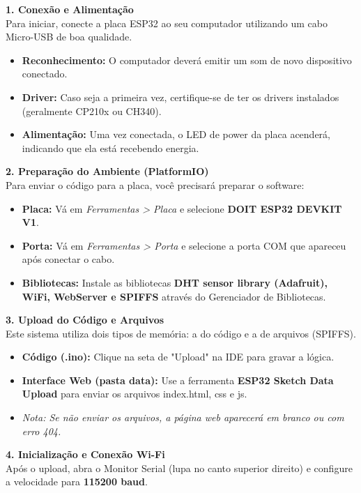 \noindent \textbf{\large 1. Conexão e Alimentação} \\
Para iniciar, conecte a placa ESP32 ao seu computador utilizando um cabo Micro-USB de boa qualidade.

\begin{itemize}
    \item \textbf{Reconhecimento:} O computador deverá emitir um som de novo dispositivo conectado.
    \item \textbf{Driver:} Caso seja a primeira vez, certifique-se de ter os drivers instalados (geralmente CP210x ou CH340).
    \item \textbf{Alimentação:} Uma vez conectada, o LED de power da placa acenderá, indicando que ela está recebendo energia.
\end{itemize}

\noindent \textbf{\large 2. Preparação do Ambiente (PlatformIO)} \\
Para enviar o código para a placa, você precisará preparar o software:

\begin{itemize}
    \item \textbf{Placa:} Vá em \textit{Ferramentas > Placa} e selecione \textbf{DOIT ESP32 DEVKIT V1}.
    \item \textbf{Porta:} Vá em \textit{Ferramentas > Porta} e selecione a porta COM que apareceu após conectar o cabo.
    \item \textbf{Bibliotecas:} Instale as bibliotecas \textbf{DHT sensor library (Adafruit), WiFi, WebServer e SPIFFS} através do Gerenciador de Bibliotecas.
\end{itemize}

\noindent \textbf{\large 3. Upload do Código e Arquivos} \\
Este sistema utiliza dois tipos de memória: a do código e a de arquivos (SPIFFS).

\begin{itemize}
    \item \textbf{Código (.ino):} Clique na seta de "Upload"  na IDE para gravar a lógica.
    \item \textbf{Interface Web (pasta data):} Use a ferramenta \textbf{ESP32 Sketch Data Upload} para enviar os arquivos index.html, css e js.
    \item \textit{Nota: Se não enviar os arquivos, a página web aparecerá em branco ou com erro 404.}
\end{itemize}

\noindent \textbf{\large 4. Inicialização e Conexão Wi-Fi} \\
Após o upload, abra o Monitor Serial (lupa no canto superior direito) e configure a velocidade para \textbf{115200 baud}.

